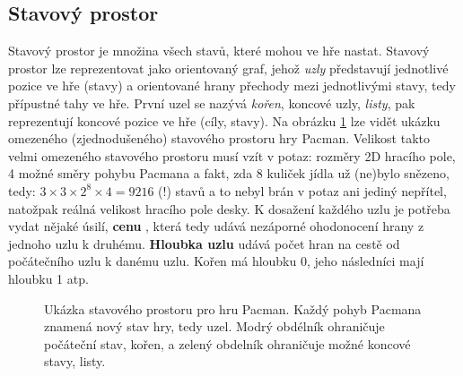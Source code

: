 \subsection*{Stavový prostor}
Stavový prostor \cite{AI1} je množina všech stavů, které mohou ve hře nastat. Stavový prostor lze reprezentovat jako orientovaný graf, jehož \textit{uzly} představují jednotlivé pozice ve hře (stavy) a orientované hrany přechody mezi jednotlivými stavy, tedy přípustné tahy ve hře. První uzel se nazývá \textit{kořen}, koncové uzly, \textit{listy}, pak reprezentují koncové pozice ve hře (cíly, stavy). Na obrázku \ref{img:stavp} lze vidět ukázku omezeného (zjednodušeného) stavového prostoru hry Pacman. Velikost takto velmi omezeného stavového prostoru musí vzít v potaz: rozměry 2D hracího pole, 4 možné směry pohybu Pacmana a fakt, zda 8 kuliček jídla už (ne)bylo snězeno, tedy:  $3 \times 3 \times 2^{8} \times 4 = 9 216$ (!) stavů a to nebyl brán v potaz ani jediný nepřítel, natožpak reálná velikost hracího pole desky.
\newline
K dosažení každého uzlu je potřeba vydat nějaké úsilí, \textbf{cenu} \cite{AI1}, která tedy udává nezáporné ohodonocení hrany z jednoho uzlu k druhému. \textbf{Hloubka uzlu} \cite{AI1} udává počet hran na cestě od počátečního uzlu k danému uzlu. Kořen má hloubku 0, jeho následníci mají hloubku 1 atp.


\begin{figure}[h]
\begin{center}
	\caption{Ukázka stavového prostoru pro hru Pacman. Každý pohyb Pacmana znamená nový stav hry, tedy uzel. Modrý obdélník ohraničuje počáteční stav, kořen, a zelený obdelník ohraničuje možné koncové stavy, listy.}
	\label{img:stavp}
\end{center}
\end{figure}

